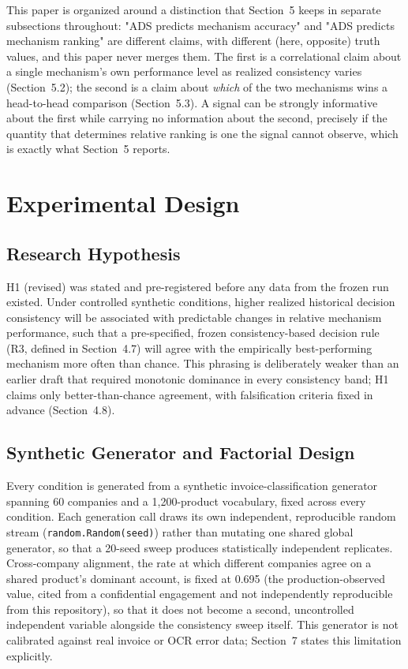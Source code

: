 \documentclass[11pt]{article}
\begin{document}
This paper is organized around a distinction that Section~5 keeps in
separate subsections throughout: "ADS predicts mechanism accuracy" and "ADS
predicts mechanism ranking" are different claims, with different (here,
opposite) truth values, and this paper never merges them. The first is a
correlational claim about a single mechanism's own performance level as
realized consistency varies (Section~5.2); the second is a claim about
\emph{which} of the two mechanisms wins a head-to-head comparison
(Section~5.3). A signal can be strongly informative about the first while
carrying no information about the second, precisely if the quantity that
determines relative ranking is one the signal cannot observe, which is
exactly what Section~5 reports.

\section{Experimental Design}
\label{sec:experimental-design}

\subsection{Research Hypothesis}
\label{sec:research-hypothesis}

H1 (revised) was stated and pre-registered before any data from the frozen
run existed. Under controlled synthetic conditions, higher realized
historical decision consistency will be associated with predictable changes
in relative mechanism performance, such that a pre-specified, frozen
consistency-based
decision rule (R3, defined in Section~4.7) will agree with the empirically
best-performing mechanism more often than chance. This phrasing is
deliberately weaker than an earlier draft that required monotonic dominance
in every consistency band; H1 claims only better-than-chance agreement, with
falsification criteria fixed in advance (Section~4.8).

\subsection{Synthetic Generator and Factorial Design}
\label{sec:generator-design}

Every condition is generated from a synthetic invoice-classification
generator spanning 60 companies and a 1,200-product vocabulary, fixed across
every condition. Each generation call draws its own independent,
reproducible random stream (\texttt{random.Random(seed)}) rather than
mutating one shared global generator, so that a 20-seed sweep produces
statistically independent replicates. Cross-company alignment, the rate at
which different companies agree on a shared product's dominant account, is
fixed at 0.695 (the production-observed value, cited from a confidential
engagement and not independently reproducible from this repository), so
that it does not become a second, uncontrolled independent variable
alongside the consistency sweep itself. This generator is not calibrated against real invoice or OCR error
data; Section~7 states this limitation explicitly.
\end{document}
